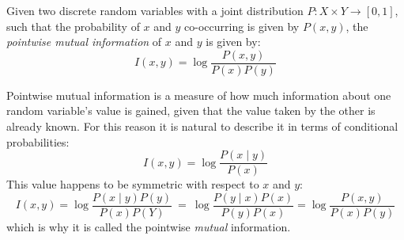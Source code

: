 \begin{definition}
  Given two discrete random variables with a joint distribution $P:X\times Y\to [0,1]$, such that the probability of $x$ and $y$ co-occurring is given by $P(x,y)$, the \emph{pointwise mutual information} of $x$ and $y$ is given by:
  \begin{equation}
    I(x,y)=\log\frac{P(x,y)}{P(x)P(y)}\label{eq:pmi}
  \end{equation}
\end{definition}

Pointwise mutual information is a measure of how much information about one random variable's value is gained, given that the value taken by the other is already known. For this reason it is natural to describe it in terms of conditional probabilities:
\begin{equation}
  I(x,y)=\log\frac{P(x\mid y)}{P(x)}
\end{equation}
This value happens to be symmetric with respect to $x$ and $y$:
\begin{equation}
  I(x,y)= \log\frac{P(x\mid y)P(y)}{P(x)P(Y)}\ =\ \log\frac{P(y\mid x)P(x)}{P(y)P(x)}=\log\frac{P(x, y)}{P(x)P(y)}
\end{equation}
which is why it is called the pointwise \emph{mutual} information.

